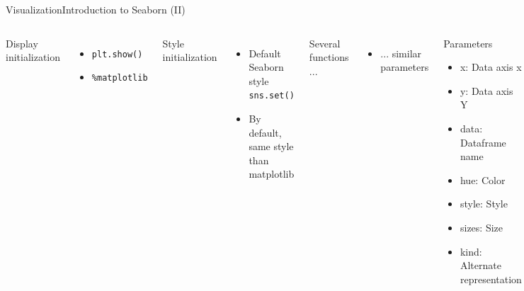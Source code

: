 \documentclass[10pt,compress]{beamer} %
\begin{document}
\begin{frame}[fragile]{Visualization}{Introduction to Seaborn (II)}
	\begin{columns}
	Display initialization
	\begin{itemize}
		\item \texttt{plt.show()}
		\item \texttt{\%matplotlib}
	\end{itemize}
	Style initialization
	\begin{itemize}
		\item Default Seaborn style \texttt{sns.set()}
		\item By default, same style than matplotlib
	\end{itemize}
	Several functions ...
	\begin{itemize}
		\item ... similar parameters
	\end{itemize}

	\begin{block}{Parameters}
	\begin{itemize}
		\item x: Data axis x
		\item y: Data axis Y
		\item data: Dataframe name
		\item hue: Color
		\item style: Style
		\item sizes: Size
		\item kind: Alternate representation
	\end{itemize}
	\end{block}
	\end{columns}
\end{frame}
\end{document}
